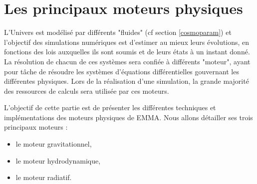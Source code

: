 \chapter{Les principaux moteurs physiques}
\label{sec:solvers}


L'Univers est modélisé par différents "fluides" (cf section \ref{cosmoparam}) et l'objectif des simulations numériques est d'estimer au mieux leurs évolutions, en fonctions des lois auxquelles ils sont soumis et de leurs états à un instant donné.
La résolution de chacun de ces systèmes sera confiée à différents "moteur", ayant pour tâche de résoudre les systèmes d'équations différentielles gouvernant les différentes physiques.
Lors de la réalisation d'une simulation, la grande majorité des ressources de calculs sera utilisée par ces moteurs.

L'objectif de cette partie est de présenter les différentes techniques et implémentations des moteurs physiques de EMMA.
Nous allons détailler ses trois principaux moteurs  :
\begin{itemize}
\item le moteur gravitationnel,
\item le moteur hydrodynamique,
\item le moteur radiatif.
\end{itemize}



